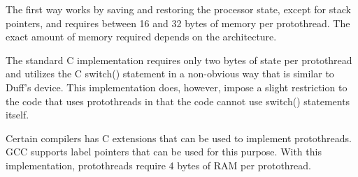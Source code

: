 \-The first way works by saving and restoring the processor state, except for stack pointers, and requires between 16 and 32 bytes of memory per protothread. \-The exact amount of memory required depends on the architecture.

\-The standard \-C implementation requires only two bytes of state per protothread and utilizes the \-C switch() statement in a non-\/obvious way that is similar to \-Duff's device. \-This implementation does, however, impose a slight restriction to the code that uses protothreads in that the code cannot use switch() statements itself.

\-Certain compilers has \-C extensions that can be used to implement protothreads. \-G\-C\-C supports label pointers that can be used for this purpose. \-With this implementation, protothreads require 4 bytes of \-R\-A\-M per protothread. 
